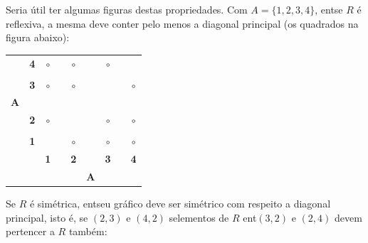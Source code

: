 Seria \'util ter algumas figuras destas propriedades. Com $A=\{1,2,3,4\}$, ent\ao se $R$ \'e reflexiva, a mesma deve conter pelo menos a diagonal principal (os quadrados na figura abaixo):

\begin{table}[h]
\centering
\begin{tabular}{ccccccccc}
\multicolumn{1}{c}{       } &  \multicolumn{1}{c|}{{\bf 4}} & $\circ$ & \qquad& $\circ$ &\quad & $\circ$ &\qquad & \frame{$\circ$} \\
\multicolumn{1}{c}{       } &  \multicolumn{1}{c|}{       } &         & \qquad&         &\quad &         &      &         \\
\multicolumn{1}{c}{       } &  \multicolumn{1}{c|}{{\bf 3}} & $\circ$ & \qquad& $\circ$ &\quad & \frame{$\circ$} &\qquad & $\circ$ \\
\multicolumn{1}{c}{{\bf A}} &  \multicolumn{1}{c|}{       } &         & \qquad&         &\quad &         &      &         \\
\multicolumn{1}{c}{       } &  \multicolumn{1}{c|}{{\bf 2}} & $\circ$ & \qquad& \frame{$\circ$} &\quad & $\circ$ &\qquad & $\circ$ \\
\multicolumn{1}{c}{       } &  \multicolumn{1}{c|}{       } &         & \qquad&         &\quad &         &      &         \\
\multicolumn{1}{c}{       } &  \multicolumn{1}{c|}{{\bf 1}} & \frame{$\circ$} & \qquad& $\circ$ &\quad & $\circ$ &\qquad & $\circ$ \\\cline{3-9}
                            &                               & {\bf 1} & \qquad& {\bf 2} &\quad & {\bf 3} &\qquad & {\bf 4} \\
                            &                               &         &      &         &{\bf A}&        &      &         \\
\end{tabular}
\end{table}

Se $R$ \'e sim\'etrica, ent\ao seu gr\'afico deve ser sim\'etrico com respeito a diagonal principal, isto \'e, se $(2,3)$ e $(4,2)$ s\ao elementos de $R$ ent\ao $(3,2)$ e $(2,4)$ devem pertencer a $R$ tamb\'em:

